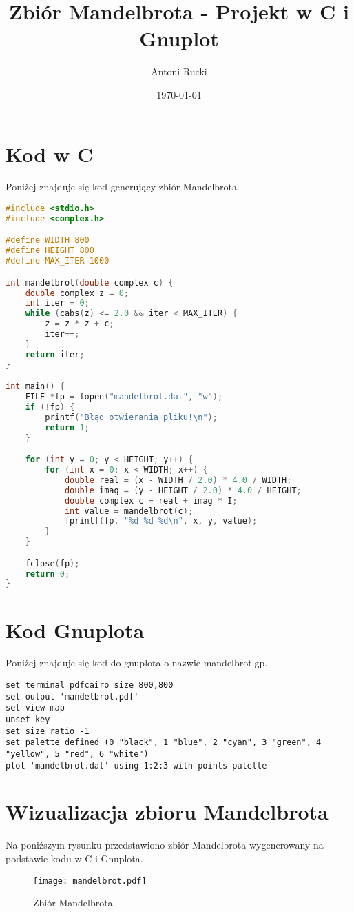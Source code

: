 \documentclass{article}
\title{Zbiór Mandelbrota - Projekt w C i Gnuplot}
\author{Antoni Rucki}
\date{\today}
\begin{document}
\maketitle
\tableofcontents
\newpage
\section{Kod w C}
Poniżej znajduje się kod generujący zbiór Mandelbrota.

\begin{lstlisting}[language=C, caption=Kod programu Mandelbrota]
#include <stdio.h>
#include <complex.h>

#define WIDTH 800
#define HEIGHT 800
#define MAX_ITER 1000

int mandelbrot(double complex c) {
    double complex z = 0;
    int iter = 0;
    while (cabs(z) <= 2.0 && iter < MAX_ITER) {
        z = z * z + c;
        iter++;
    }
    return iter;
}

int main() {
    FILE *fp = fopen("mandelbrot.dat", "w");
    if (!fp) {
        printf("Błąd otwierania pliku!\n");
        return 1;
    }

    for (int y = 0; y < HEIGHT; y++) {
        for (int x = 0; x < WIDTH; x++) {
            double real = (x - WIDTH / 2.0) * 4.0 / WIDTH;
            double imag = (y - HEIGHT / 2.0) * 4.0 / HEIGHT;
            double complex c = real + imag * I;
            int value = mandelbrot(c);
            fprintf(fp, "%d %d %d\n", x, y, value);
        }
    }

    fclose(fp);
    return 0;
}
\end{lstlisting}

\newpage
\section{Kod Gnuplota}
Poniżej znajduje się kod do gnuplota o nazwie mandelbrot.gp.
\begin{lstlisting}[language=Gnuplot, caption=Kod Gnuplota]
set terminal pdfcairo size 800,800
set output 'mandelbrot.pdf'
set view map
unset key
set size ratio -1
set palette defined (0 "black", 1 "blue", 2 "cyan", 3 "green", 4 "yellow", 5 "red", 6 "white")
plot 'mandelbrot.dat' using 1:2:3 with points palette
\end{lstlisting}

\newpage
\section{Wizualizacja zbioru Mandelbrota}
Na poniższym rysunku przedstawiono zbiór Mandelbrota wygenerowany na podstawie kodu w C i Gnuplota.

\begin{figure}[h]
    \centering
    \texttt{[image: mandelbrot.pdf]}
    \caption{Zbiór Mandelbrota}
    \label{fig:mandelbrot}
\end{figure}
\end{document}
